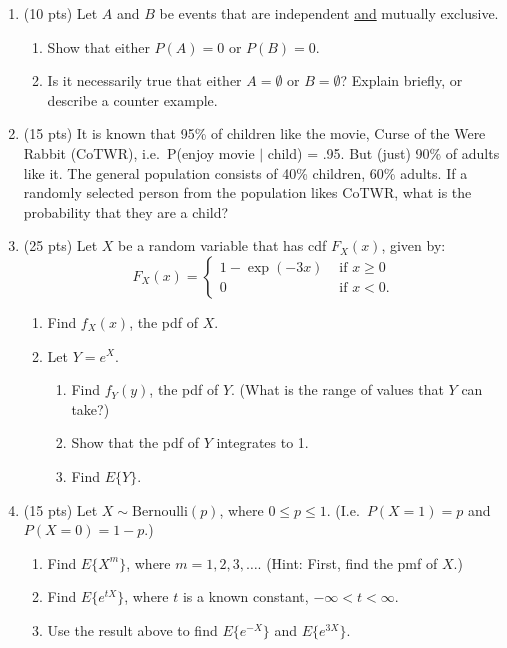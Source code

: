 \documentclass[12pt]{article}
\begin{document}
\begin{enumerate}
\item (10 pts)  Let $A$ and $B$ be events that are independent {\underline{and}} mutually exclusive.
\begin{enumerate}
\item Show that either $P(A)=0$ or $P(B)=0.$
\item Is it necessarily true that either $A=\emptyset$ or $B=\emptyset$?
    Explain briefly, or describe a counter example.
\end{enumerate}

\item (15 pts) It is known that 95\% of children like the movie, 
Curse of the Were Rabbit (CoTWR), i.e.\ P(enjoy  movie $|$ child) = .95.
But (just) 90\% of adults like it.  The general population consists of
40\% children, 60\% adults.
If a randomly selected person from the population
likes CoTWR, what is the probability that they are a child?

\item (25 pts) Let $X$ be a random variable that has cdf $F_X(x)$, given by:
$$F_X(x) = \left\{ \begin{array}{ll}
 1-\exp(-3x) & {\mbox{ if }} x \ge 0 \\
 0 & {\mbox{ if }} x < 0.
 \end{array} \right. $$
  \begin{enumerate}
  \item Find $f_X(x)$, the pdf of $X$.
  \item Let $Y = e^X$.
    \begin{enumerate}
    \item Find $f_Y(y)$, the pdf of $Y$. (What is the range of values that $Y$ can take?)
    \item Show that the pdf of $Y$ integrates to 1.
    \item Find $E\{Y\}$.
    \end{enumerate}
  \end{enumerate}
 
\item (15 pts) Let $X \sim {\mbox{Bernoulli}}(p)$, where $0 \le p \le 1.$
  (I.e.\, $P(X=1)=p$ and $P(X=0)=1-p.$)
  \begin{enumerate}
  \item Find $E\{X^m\}$, where  $m = 1,2,3,\ldots.$ (Hint: First, find the pmf of $X$.)
  \item Find $E\{e^{tX}\}$, where $t$ is a known constant, $-\infty < t < \infty$.
  \item Use the result above to find
    $E\{e^{-X}\}$ and $E\{e^{3X}\}$.
  \end{enumerate}


\end{enumerate}
\end{document}
